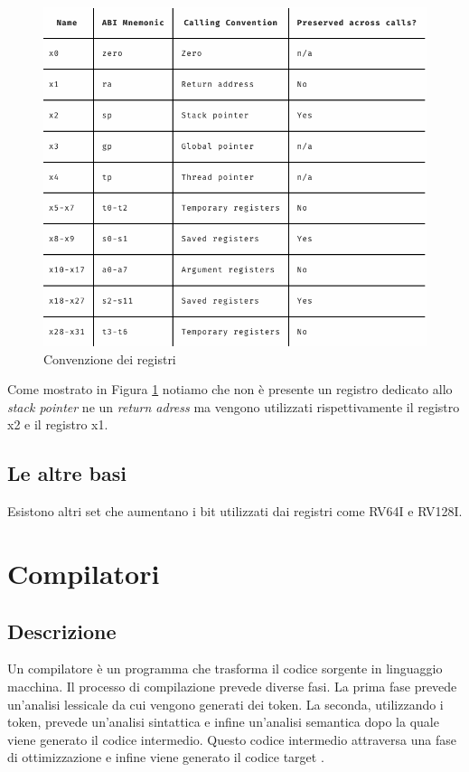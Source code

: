 \documentclass[12pt, a4paper]{report}
\begin{document}
\begin{figure}[h!]
\centering
	\includegraphics[scale=0.3]{ABI-RISC-V}
	\caption{Convenzione dei registri}
	\label{Fig:ConvenzioneRegistri}
\end{figure}

Come mostrato in Figura \ref{Fig:ConvenzioneRegistri} notiamo che non è presente un registro dedicato allo \textit{stack pointer} ne un \textit{return adress} ma vengono utilizzati rispettivamente il registro x2 e il registro x1.


\section{Le altre basi}
Esistono altri set che aumentano i bit utilizzati dai registri come RV64I e RV128I. 





\chapter{Compilatori}
\section{Descrizione}
Un compilatore è un programma che trasforma il codice sorgente in linguaggio macchina. Il processo di compilazione prevede diverse fasi. La prima fase prevede un'analisi lessicale da cui vengono generati dei token. La seconda, utilizzando i token, prevede un'analisi sintattica e infine un'analisi semantica dopo la quale viene generato il codice intermedio. Questo codice intermedio attraversa una fase di ottimizzazione e infine viene generato il codice target \cite{GCC} \cite{LLVM}.
\end{document}
